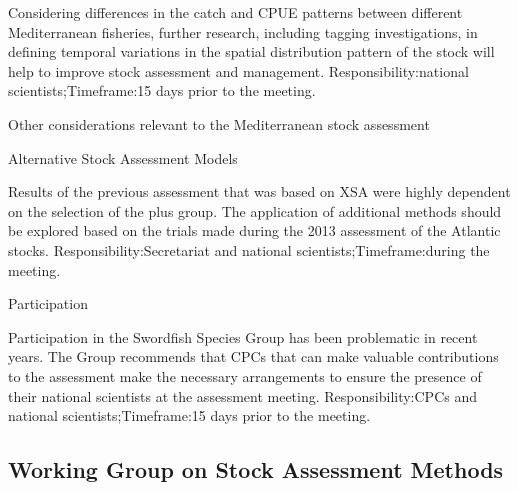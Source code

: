 \documentclass[a4paper,10pt]{article}
\begin{document}
Considering differences in the catch and CPUE patterns between different Mediterranean fisheries, further research, including tagging investigations, in defining temporal variations in the spatial distribution pattern of the stock will help to improve stock assessment and management.
Responsibility:national scientists;Timeframe:15 days prior to the meeting.

Other considerations relevant to the Mediterranean stock assessment

Alternative Stock Assessment Models

Results of the previous assessment that was based on XSA were highly dependent on the selection of the plus group. The application of additional methods should be explored based on the trials made during the 2013 assessment of the Atlantic stocks. 
Responsibility:Secretariat and national scientists;Timeframe:during the meeting.


Participation

Participation in the Swordfish Species Group has been problematic in recent years. The Group recommends that CPCs that can make valuable contributions to the assessment make the necessary arrangements to ensure the presence of their national scientists at the assessment meeting.
Responsibility:CPCs and national scientists;Timeframe:15 days prior to the meeting.


\newpage
\subsection{Working Group on Stock Assessment Methods}
\end{document}
